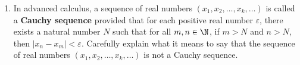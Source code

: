 \begin{enumerate}
\begin{enumerate}
  \item In advanced calculus, a sequence of real numbers $\left(x_1, x_2, \ldots, x_k, \ldots \right)$ is called a 
\textbf{Cauchy sequence} 
%
 provided that for each positive real number $\varepsilon$, there exists a natural number $N$ such that for all 
$m, n \in \N$, if $m > N$ and $n > N$, then $\left| x_n - x_m \right| < \varepsilon$.  Carefully explain what it means to say that the sequence of real numbers  $\left(x_1, x_2, \ldots, x_k, \ldots \right)$ is not a Cauchy sequence.
\end{enumerate}



%

\end{enumerate}




